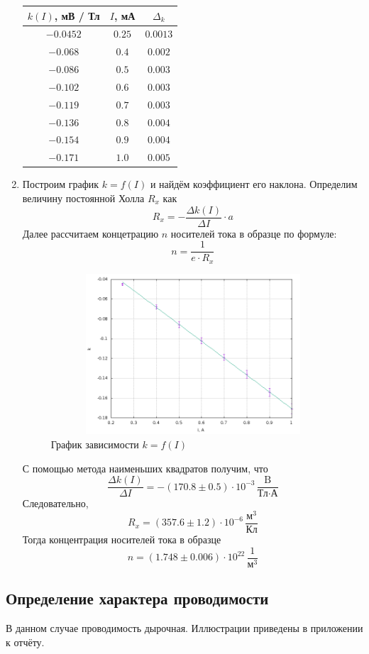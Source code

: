 \documentclass[12pt]{article}
\begin{document}
\begin{enumerate}
\begin{table}[h!]
\begin{tabular}{|c|c|c|}
			$k(I)$, мВ / Тл & $I$, мА & $\Delta_k$ \\
		\hline
			$-0.0452$ & $0.25$ & $0.0013$ \\
		\hline
			$-0.068$ & $0.4$ & $0.002$ \\
		\hline
			$-0.086$ & $0.5$ & $0.003$ \\
		\hline
			$-0.102$ & $0.6$ & $0.003$ \\
		\hline
			$-0.119$ & $0.7$ & $0.003$ \\
		\hline
			$-0.136$ & $0.8$ & $0.004$ \\
		\hline
			$-0.154$ & $0.9$ & $0.004$ \\
		\hline
			$-0.171$ & $1.0$ & $0.005$ \\							 	
		\hline
		\end{tabular}
	\end{table}	
	\item
		Построим график $k = f(I)$ и найдём коэффициент его наклона. Определим величину постоянной Холла $R_x$ как
	\[
		R_x = - \frac{\Delta k(I)}{\Delta I} \cdot a
	\]
		Далее рассчитаем концетрацию $n$ носителей тока в образце по формуле:
	\[
		n = \frac{1}{e \cdot R_x}
	\]			
	\newpage
	\begin{figure}[h!]
		\centering
		\includegraphics[height = 6cm, width = 12cm]{plot3.png}
		\caption{График зависимости $k = f(I)$}
	\end{figure}
	С помощью метода наименьших квадратов получим, что
	\[
		\frac{\Delta k(I)}{\Delta I} = - \left(170.8 \pm 0.5 \right) \cdot 10^{-3}\, \frac{\text{B}}{\text{Тл} \cdot \text{А}}
	\]
	Следовательно, 
	\[
		R_x = \left(357.6 \pm 1.2 \right) \cdot 10^{-6} \, \frac{{\text{м}}^3}{\text{Кл}} 
	\]
	Тогда концентрация носителей тока в образце
	\[
		n = \left(1.748 \pm 0.006 \right) \cdot 10^{22} \, \frac{1}{\text{м}^3}
	\]
\end{enumerate}
\subsection*{Определение характера проводимости}
	В данном случае проводимость дырочная. Иллюстрации приведены в приложении к отчёту.
\end{document}
